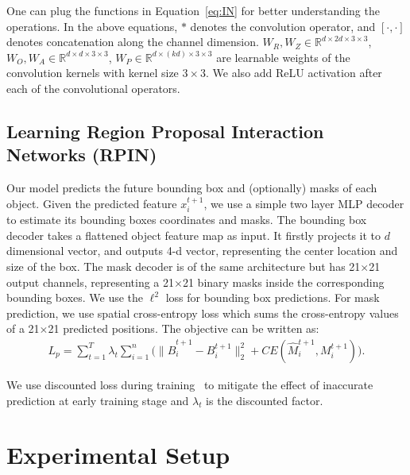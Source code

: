 \documentclass{article} \usepackage{iclr2021_conference,times}
\newcommand{\numoutput}{T}
\begin{document}
One can plug the functions in Equation~\ref{eq:IN} for better understanding the operations. In the above equations, $*$ denotes the convolution operator, and $[\cdot,\cdot]$ denotes concatenation along the channel dimension. $W_R, W_Z \in \mathbb{R}^{d\times 2d \times 3 \times 3}$, $W_O, W_A \in \mathbb{R}^{d\times d \times 3 \times 3}$, $W_P \in \mathbb{R}^{d\times (kd) \times 3 \times 3}$ are learnable weights of the convolution kernels with kernel size $3 \times 3$. We also add ReLU activation after each of the convolutional operators.

\vspace{-0.5em}
\subsection{Learning Region Proposal Interaction Networks (RPIN)}
\vspace{-0.5em}
Our model predicts the future bounding box and (optionally) masks of each object. Given the predicted feature $x_i^{t+1}$, we use a simple two layer MLP decoder to estimate its bounding boxes coordinates and masks. The bounding box decoder takes a flattened object feature map as input. It firstly projects it to $d$ dimensional vector, and outputs 4-d vector, representing the center location and size of the box. The mask decoder is of the same architecture but has 21$\times$21 output channels, representing a 21$\times$21 binary masks inside the corresponding bounding boxes. We use the $\ell^2$ loss for bounding box predictions. For mask prediction, we use spatial cross-entropy loss which sums the cross-entropy values of a 21$\times$21 predicted positions. The objective can be written as:
\vspace{-0.2em}
\begin{align}
L_p = \sum_{t=1}^{\numoutput} \lambda_t \sum_{i=1}^{n} \Big(  \|\hat{B}_i^{t+1} - B_i^{t+1}\|_2^2 + CE(\hat{M}_{i}^{t+1}, M_{i}^{t+1}) \Big).
\end{align}
\vspace{-0.4em}

We use discounted loss during training~\citep{watters2017visual} to mitigate the effect of inaccurate prediction at early training stage and $\lambda_t$ is the discounted factor.

\vspace{-0.6em}
\section{Experimental Setup}
\vspace{-0.6em}
\end{document}
